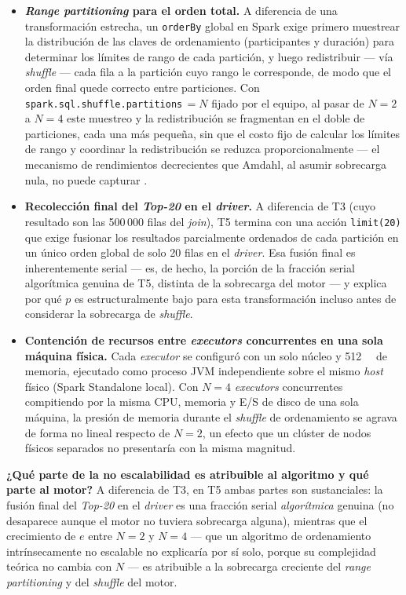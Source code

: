\documentclass[10pt,conference]{IEEEtran}
\begin{document}
\begin{itemize}
  \item \textbf{\textit{Range partitioning} para el orden total.} A diferencia de una transformación estrecha, un \texttt{orderBy} global en Spark exige primero muestrear la distribución de las claves de ordenamiento (participantes y duración) para determinar los límites de rango de cada partición, y luego redistribuir --- vía \textit{shuffle} --- cada fila a la partición cuyo rango le corresponde, de modo que el orden final quede correcto entre particiones. Con \texttt{spark.sql.shuffle.partitions}\,$=N$ fijado por el equipo, al pasar de $N=2$ a $N=4$ este muestreo y la redistribución se fragmentan en el doble de particiones, cada una más pequeña, sin que el costo fijo de calcular los límites de rango y coordinar la redistribución se reduzca proporcionalmente --- el mecanismo de rendimientos decrecientes que Amdahl, al asumir sobrecarga nula, no puede capturar \cite{hillmarty2008}.
  \item \textbf{Recolección final del \textit{Top-20} en el \textit{driver}.} A diferencia de T3 (cuyo resultado son las 500\,000 filas del \textit{join}), T5 termina con una acción \texttt{limit(20)} que exige fusionar los resultados parcialmente ordenados de cada partición en un único orden global de solo 20 filas en el \textit{driver}. Esa fusión final es inherentemente serial --- es, de hecho, la porción de la fracción serial algorítmica genuina de T5, distinta de la sobrecarga del motor --- y explica por qué $p$ es estructuralmente bajo para esta transformación incluso antes de considerar la sobrecarga de \textit{shuffle}.
  \item \textbf{Contención de recursos entre \textit{executors} concurrentes en una sola máquina física.} Cada \textit{executor} se configuró con un solo núcleo y \SI{512}{\mebi\byte} de memoria, ejecutado como proceso JVM independiente sobre el mismo \textit{host} físico (Spark Standalone local). Con $N=4$ \textit{executors} concurrentes compitiendo por la misma CPU, memoria y E/S de disco de una sola máquina, la presión de memoria durante el \textit{shuffle} de ordenamiento se agrava de forma no lineal respecto de $N=2$, un efecto que un clúster de nodos físicos separados no presentaría con la misma magnitud.
\end{itemize}

\textbf{¿Qué parte de la no escalabilidad es atribuible al algoritmo y qué parte al motor?} A diferencia de T3, en T5 ambas partes son sustanciales: la fusión final del \textit{Top-20} en el \textit{driver} es una fracción serial \emph{algorítmica} genuina (no desaparece aunque el motor no tuviera sobrecarga alguna), mientras que el crecimiento de $e$ entre $N=2$ y $N=4$ --- que un algoritmo de ordenamiento intrínsecamente no escalable no explicaría por sí solo, porque su complejidad teórica no cambia con $N$ --- es atribuible a la sobrecarga creciente del \textit{range partitioning} y del \textit{shuffle} del motor.
\end{document}
